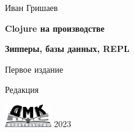
\begin{titlepage}

\begin{center}

  {Иван Гришаев}

  \vspace*{5cm}

  {\Large\textbf{Clojure на производстве}}

  \vspace{1mm}

  {\Large\textbf{Зипперы, базы данных, REPL}}

  \vspace{7mm}

  {\Large Первое издание}

  {\small Редакция \COMMITHASH}

  \vspace*{\fill}

  \ifdmk
    \includegraphics[width=20mm]{media/dmk_logo}%
  \else
    {2023}
  \fi

\end{center}

\end{titlepage}
